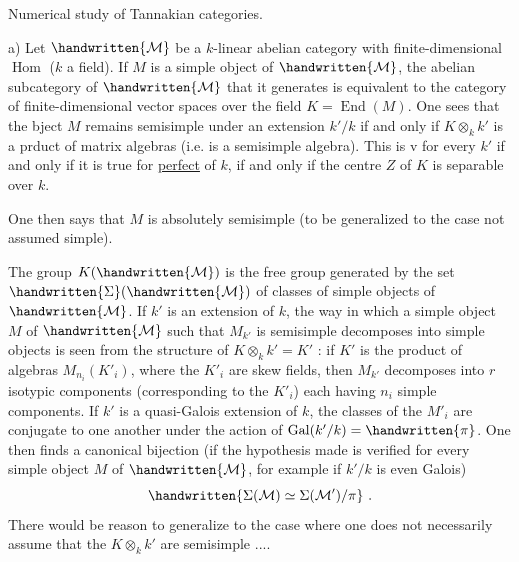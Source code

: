 Numerical study of Tannakian categories.

a) Let $\handwritten{\mathcal{M}}$ be a $k$-linear abelian category with finite-dimensional $\operatorname{Hom}$ ($k$ a field). If $M$ is a simple object of $\handwritten{\mathcal{M}}$, the abelian subcategory of $\handwritten{\mathcal{M}}$ that it generates is equivalent to the category of finite-dimensional vector spaces over the field $K=\operatorname{End}(M)$. One sees  that the bject $M$ remains semisimple under an extension $k'/k$ if and only if $K\otimes_k k'$ is a prduct  of matrix algebras (i.e. is a semisimple algebra). This is v for every $k'$ if and only if it is true for  \uline{perfect} of $k$,  if and only if the centre  $Z$ of $K$ is separable over $k$. One then says that $M$ is absolutely semisimple (to be generalized to the case not assumed simple).

The group $K(\handwritten{\mathcal{M}})$ is the free group generated by the set $\handwritten{\Sigma}(\handwritten{\mathcal{M}})$ of classes of simple objects of $\handwritten{\mathcal{M}}$. If $k'$ is an extension of $k$, the way in which a simple object $M$ of $\handwritten{\mathcal{M}}$ such that $M_{k'}$ is semisimple decomposes into simple objects is seen from the structure of $K\otimes_k k'=K'$ : if $K'$ is the product of algebras $M_{n_i}(K'_i)$, where the $K'_i$ are skew fields, then $M_{k'}$ decomposes into $r$ isotypic components (corresponding to the $K'_i$) each having $n_i$ simple components. If $k'$ is a quasi-Galois extension of $k$, the classes of the $M'_i$ are conjugate to one another under the action of $\operatorname{Gal}(k'/k)=\handwritten{\pi}$. One then finds a canonical bijection (if the hypothesis made is verified for every simple object  $M$ of $\handwritten{\mathcal{M}}$, for example if $k'/k$ is even Galois)
\[
\handwritten{\Sigma(\mathcal{M})\simeq\Sigma(\mathcal{M}')/\pi}\ .
\]
There would be reason to generalize to the case where one does not necessarily assume that the $K\otimes_k k'$ are semisimple ....

